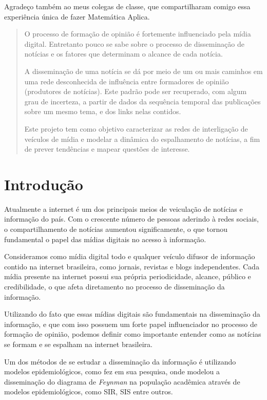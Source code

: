 \documentclass[a4paper,12pt]{article}
\begin{document}
Agradeço também ao meus colegas de classe, que compartilharam comigo essa experiência única de fazer Matemática Aplica. 

\pagebreak
\begin{abstract}
 
O processo de formação de opinião é fortemente influenciado pela mídia digital.
Entretanto pouco se sabe sobre o processo de disseminação de notícias e os fatores que determinam o alcance de cada
notícia.

A disseminação de uma notícia se dá por meio de um ou mais caminhos em uma rede desconhecida de influência entre 
formadores de opinião (produtores de notícias). Este padrão pode ser recuperado, com algum grau de incerteza, a partir de dados
da sequência temporal das publicações sobre um mesmo tema, e dos links nelas contidos.

Este projeto tem como objetivo caracterizar as redes de interligação de veículos de mídia e modelar a dinâmica do espalhamento 
de notícias, a fim de prever tendências e mapear questões de interesse.

\end{abstract}

\pagebreak

\section{Introdução}
\onehalfspacing
Atualmente a internet é um dos principais meios de veiculação de notícias e informação do país. Com o crescente
número de pessoas aderindo à redes sociais, o compartilhamento de notícias aumentou significamente, o que tornou fundamental
o papel das mídias digitais no acesso à informação.

Consideramos como mídia digital todo e qualquer veículo difusor de informação contido na internet brasileira, como jornais, revistas e 
blogs independentes. Cada mídia presente na internet possui sua própria periodicidade, alcance, público e credibilidade, o que afeta
diretamento no processo de disseminação da informação.

Utilizando do fato que essas mídias digitais são fundamentais na disseminação da informação, e que com isso possuem um forte papel 
influenciador no processo de formação de opinião, podemos definir como importante entender como as notícias se formam e se espalham
na internet brasileira.

Um dos métodos de se estudar a disseminação da informação é utilizando modelos epidemiológicos, como \cite{bettencourt2006power} 
fez em sua pesquisa, onde modelou a disseminação do diagrama de \textit{Feynman} na população acadêmica através de modelos epidemiológicos, como SIR, SIS entre
outros.
\end{document}
